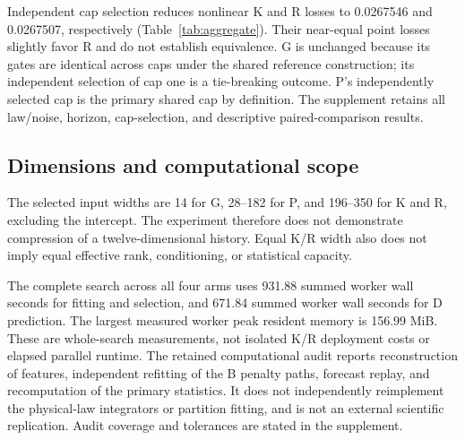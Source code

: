 Independent cap selection reduces nonlinear K and R losses to 0.0267546 and 0.0267507, respectively (Table~\ref{tab:aggregate}). Their near-equal point losses slightly favor R and do not establish equivalence. G is unchanged because its gates are identical across caps under the shared reference construction; its independent selection of cap one is a tie-breaking outcome. P's independently selected cap is the primary shared cap by definition. The supplement retains all law/noise, horizon, cap-selection, and descriptive paired-comparison results.

\subsection{Dimensions and computational scope}
The selected input widths are 14 for G, 28--182 for P, and 196--350 for K and R, excluding the intercept. The experiment therefore does not demonstrate compression of a twelve-dimensional history. Equal K/R width also does not imply equal effective rank, conditioning, or statistical capacity.

The complete search across all four arms uses 931.88 summed worker wall seconds for fitting and selection, and 671.84 summed worker wall seconds for D prediction. The largest measured worker peak resident memory is 156.99 MiB. These are whole-search measurements, not isolated K/R deployment costs or elapsed parallel runtime. The retained computational audit reports reconstruction of features, independent refitting of the B penalty paths, forecast replay, and recomputation of the primary statistics. It does not independently reimplement the physical-law integrators or partition fitting, and is not an external scientific replication. Audit coverage and tolerances are stated in the supplement.
